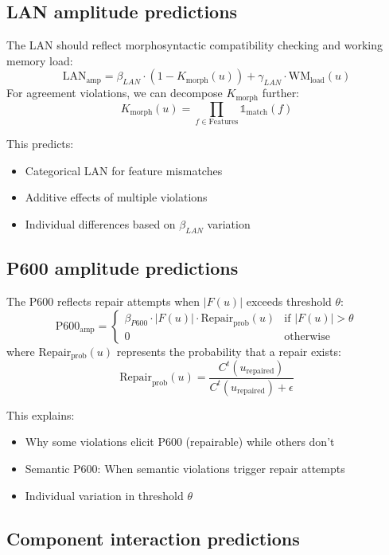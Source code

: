 \documentclass[12pt,letterpaper]{article}
\begin{document}
\subsection{LAN amplitude predictions}

The LAN should reflect morphosyntactic compatibility checking and working memory load:
\[
\text{LAN}_{\text{amp}} = \beta_{LAN} \cdot (1 - K_{\text{morph}}(u)) + \gamma_{LAN} \cdot \text{WM}_{\text{load}}(u)
\]
For agreement violations, we can decompose $K_{\text{morph}}$ further:
\[
K_{\text{morph}}(u) = \prod_{f \in \text{Features}} \mathbb{1}_{\text{match}}(f)
\]

This predicts:
\begin{itemize}
    \item Categorical LAN for feature mismatches
    \item Additive effects of multiple violations
    \item Individual differences based on $\beta_{LAN}$ variation
\end{itemize}

\subsection{P600 amplitude predictions}

The P600 reflects repair attempts when $|F(u)|$ exceeds threshold $\theta$:
\[
\text{P600}_{\text{amp}} = \begin{cases}
\beta_{P600} \cdot |F(u)| \cdot \text{Repair}_{\text{prob}}(u) & \text{if } |F(u)| > \theta \\
0 & \text{otherwise}
\end{cases}
\]
where Repair$_{\text{prob}}(u)$ represents the probability that a repair exists:
\[
\text{Repair}_{\text{prob}}(u) = \frac{C^t(u_{\text{repaired}})}{C^t(u_{\text{repaired}}) + \epsilon}
\]

This explains:
\begin{itemize}
    \item Why some violations elicit P600 (repairable) while others don't
    \item Semantic P600: When semantic violations trigger repair attempts
    \item Individual variation in threshold $\theta$
\end{itemize}

\subsection{Component interaction predictions}
\end{document}
